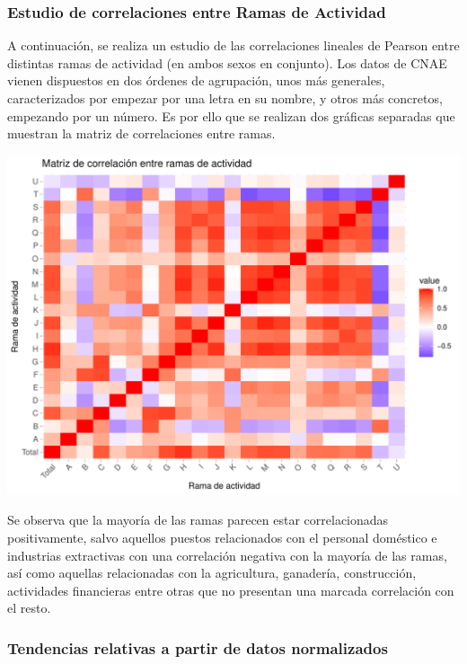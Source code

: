 \documentclass[Universitat de
València,article,submit,moreauthors,pdftex]{Definitions/mdpi}
\begin{document}
\subsubsection{Estudio de correlaciones entre Ramas de
Actividad}\label{estudio-de-correlaciones-entre-ramas-de-actividad}

A continuación, se realiza un estudio de las correlaciones lineales de
Pearson entre distintas ramas de actividad (en ambos sexos en conjunto).
Los datos de CNAE vienen dispuestos en dos órdenes de agrupación, unos
más generales, caracterizados por empezar por una letra en su nombre, y
otros más concretos, empezando por un número. Es por ello que se
realizan dos gráficas separadas que muestran la matriz de correlaciones
entre ramas.

\includegraphics{ProyectoAED2024_files/figure-latex/unnamed-chunk-40-1.pdf}

Se observa que la mayoría de las ramas parecen estar correlacionadas
positivamente, salvo aquellos puestos relacionados con el personal
doméstico e industrias extractivas con una correlación negativa con la
mayoría de las ramas, así como aquellas relacionadas con la agricultura,
ganadería, construcción, actividades financieras entre otras que no
presentan una marcada correlación con el resto.

\subsubsection{Tendencias relativas a partir de datos
normalizados}\label{tendencias-relativas-a-partir-de-datos-normalizados}
\end{document}
